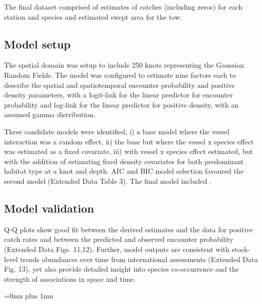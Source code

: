 \documentclass{nature}
\begin{document}
\begin{linenumbers}
The final dataset comprised of estimates of catches (including zeros) for each
station and species and estimated swept area for the tow.

\subsection{Model setup}

The spatial domain was setup to include 250 knots representing the Gaussian
Random Fields. The model was configured to estimate nine factors each to describe
the spatial and spatiotemporal encounter probability and positive density
parameters, with a logit-link for the linear predictor for encounter
probability and log-link for the linear predictor for positive density, with an
assumed gamma distribution.

Three candidate models were identified, i) a base model where the vessel
interaction was a random effect, ii) the base but where the vessel x species
effect was estimated as a fixed covariate, iii) with vessel x species effect
estimated, but with the addition of estimating fixed density covariates for
both predominant habitat type at a knot and depth. AIC and BIC model selection
favoured the second model (Extended Data Table 3). The final model included
.

\subsection{Model validation}

Q-Q plots show good fit between the derived estimates and the data for positive
catch rates and between the predicted and observed encounter probability
(Extended Data Figs. 11,12).  Further, model outputs are consistent with
stock-level trends abundances over time from international assessments
(Extended Data Fig. 13), yet also provide detailed insight into species
co-occurrence and the strength of associations in space and time. 

\end{linenumbers}
\newpage
\Urlmuskip=0mu plus 1mu\relax

\small{}

\end{document}
